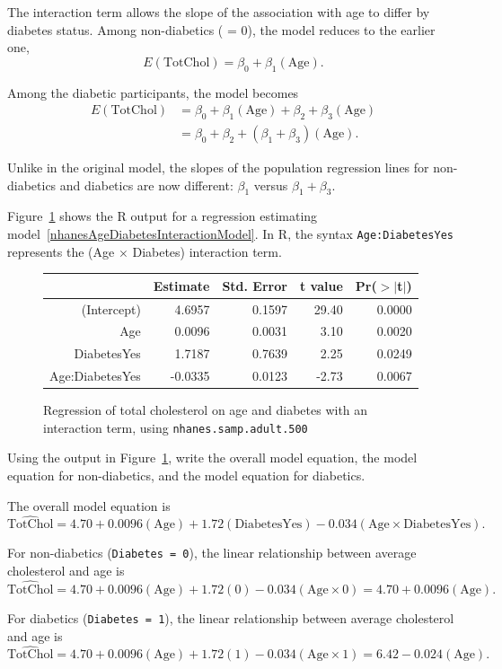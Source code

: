 The interaction term allows the slope of the association with age to differ by diabetes status. Among non-diabetics ( = 0), the model reduces to the earlier one,
\[E(\text{TotChol}) = \beta_0 + \beta_1(\text{Age}). \]

Among the diabetic participants, the model becomes
\begin{align*}
  E(\text{TotChol}) &= \beta_0  + \beta_1(\text{Age}) + \beta_2 + 
       \beta_3 (\text{Age}) \\
       & = \beta_0 + \beta_2 + (\beta_1 + \beta_3)(\text{Age}).
\end{align*}

Unlike in the original model, the slopes of the population regression lines for non-diabetics and diabetics are now different: $\beta_1$ versus $\beta_1 + \beta_3$.

Figure~\ref{nhanesAgeDiabetesInteraction} shows the \textsf{R} output for a regression estimating model~\ref{nhanesAgeDiabetesInteractionModel}. In \textsf{R}, the syntax \texttt{Age:DiabetesYes} represents the (Age $\times$ Diabetes) interaction term. 

\begin{figure}[ht]
\centering
\begin{tabular}{rrrrr}
  \hline
 & Estimate & Std. Error & t value & Pr($>$$|$t$|$) \\ 
  \hline
(Intercept) & 4.6957 & 0.1597 & 29.40 & 0.0000 \\ 
  Age & 0.0096 & 0.0031 & 3.10 & 0.0020 \\ 
  DiabetesYes & 1.7187 & 0.7639 & 2.25 & 0.0249 \\ 
  Age:DiabetesYes & -0.0335 & 0.0123 & -2.73 & 0.0067 \\ 
   \hline
\end{tabular}
\caption{Regression of total cholesterol on age and diabetes with an interaction term, using \texttt{nhanes.samp.adult.500}} 
\label{nhanesAgeDiabetesInteraction}
\end{figure}

\begin{examplewrap}
\begin{nexample}{Using the output in Figure~\ref{nhanesAgeDiabetesInteraction}, write the overall model equation, the model equation for non-diabetics, and the model equation for diabetics.}
	
	The overall model equation is 
	\[\widehat{\text{TotChol}} = 4.70 + 0.0096(\text{Age}) + 1.72(\text{DiabetesYes})
	- 0.034(\text{Age} \times \text{DiabetesYes}). \]
	
	For non-diabetics (\texttt{Diabetes = 0}), the linear relationship between average cholesterol and age is
	\[\widehat{\text{TotChol}} = 4.70 + 0.0096(\text{Age}) + 1.72(0)
	- 0.034(\text{Age} \times 0) = 4.70 + 0.0096(\text{Age}).\]
	
	For diabetics (\texttt{Diabetes = 1}), the linear relationship between average cholesterol and age is
	\[\widehat{\text{TotChol}} = 4.70 + 0.0096(\text{Age}) + 1.72(1)
	- 0.034(\text{Age} \times 1) = 6.42 - 0.024(\text{Age}). \]
\end{nexample}
\end{examplewrap}

